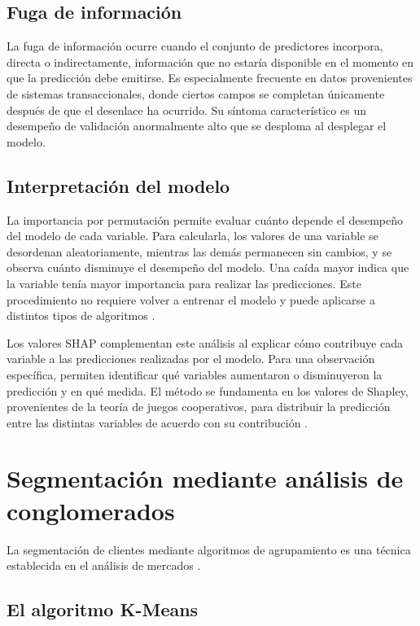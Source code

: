 \subsection{Fuga de información}

La fuga de información ocurre cuando el conjunto de predictores incorpora, directa
o indirectamente, información que no estaría disponible en el momento en que la
predicción debe emitirse. Es especialmente frecuente en datos provenientes de
sistemas transaccionales, donde ciertos campos se completan únicamente después de
que el desenlace ha ocurrido. Su síntoma característico es un desempeño de
validación anormalmente alto que se desploma al desplegar el modelo.

\subsection{Interpretación del modelo}

La importancia por permutación permite evaluar cuánto depende el desempeño del modelo de cada variable. Para calcularla, los valores de una variable se desordenan aleatoriamente, mientras las demás permanecen sin cambios, y se observa cuánto disminuye el desempeño del modelo. Una caída mayor indica que la variable tenía mayor importancia para realizar las predicciones. Este procedimiento no requiere volver a entrenar el modelo y puede aplicarse a distintos tipos de algoritmos \cite{breiman2001random}.

Los valores SHAP complementan este análisis al explicar cómo contribuye cada variable a las predicciones realizadas por el modelo. Para una observación específica, permiten identificar qué variables aumentaron o disminuyeron la predicción y en qué medida. El método se fundamenta en los valores de Shapley, provenientes de la teoría de juegos cooperativos, para distribuir la predicción entre las distintas variables de acuerdo con su contribución \cite{lundberg2017unified}.

\section{Segmentación mediante análisis de conglomerados}

La segmentación de clientes mediante algoritmos de agrupamiento es una técnica
establecida en el análisis de mercados \cite{kaufman1990finding}.

\subsection{El algoritmo K-Means}


